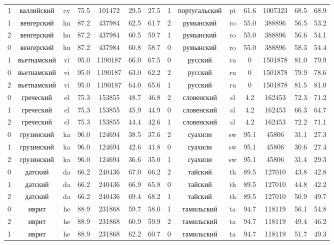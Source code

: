 \begin{table*}
{\begin{tabular}{|c|c|c|c|c|c|c|||c|c|c|c|c|c|c|}
1 & валлийский & cy & 75.5 & 101472 & 29.5 & 27.5 & 1 & португальский & pt & 61.6 & 1007323 & 68.5 & 68.9\\
1 & венгерский & hu & 87.2 & 437984 & 62.5 & 61.7 & 2 & румынский & ro & 55.0 & 388896 & 56.5 & 53.2\\
2 & венгерский & hu & 87.2 & 437984 & 60.5 & 59.7 & 1 & румынский & ro & 55.0 & 388896 & 56.6 & 54.1\\
0 & венгерский & hu & 87.2 & 437984 & 60.8 & 58.7 & 0 & румынский & ro & 55.0 & 388896 & 58.3 & 54.4\\
1 & вьетнамский & vi & 95.0 & 1190187 & 66.0 & 67.5 & 0 & русский & ru & 0 & 1501878 & 81.0 & 79.9\\
0 & вьетнамский & vi & 95.0 & 1190187 & 63.0 & 62.2 & 2 & русский & ru & 0 & 1501878 & 79.9 & 78.6\\
2 & вьетнамский & vi & 95.0 & 1190187 & 64.0 & 65.6 & 1 & русский & ru & 0 & 1501878 & 81.5 & 81.0\\
0 & греческий & el & 75.3 & 153855 & 48.7 & 46.8 & 2 & словенский & sl & 4.2 & 162453 & 72.3 & 71.2\\
1 & греческий & el & 75.3 & 153855 & 45.9 & 44.9 & 0 & словенский & sl & 4.2 & 162453 & 66.3 & 64.7\\
2 & греческий & el & 75.3 & 153855 & 44.4 & 42.6 & 1 & словенский & sl & 4.2 & 162453 & 72.2 & 71.1\\
0 & грузинский & ka & 96.0 & 124694 & 38.5 & 37.6 & 2 & суахили & sw & 95.1 & 45806 & 31.1 & 27.3\\
1 & грузинский & ka & 96.0 & 124694 & 42.6 & 41.8 & 0 & суахили & sw & 95.1 & 45806 & 30.6 & 27.4\\
2 & грузинский & ka & 96.0 & 124694 & 36.6 & 35.0 & 1 & суахили & sw & 95.1 & 45806 & 31.4 & 29.3\\
0 & датский & da & 66.2 & 240436 & 67.0 & 66.2 & 2 & тайский & th & 89.5 & 127010 & 43.8 & 42.8\\
1 & датский & da & 66.2 & 240436 & 66.9 & 65.8 & 0 & тайский & th & 89.5 & 127010 & 44.8 & 42.2\\
2 & датский & da & 66.2 & 240436 & 69.4 & 68.2 & 1 & тайский & th & 89.5 & 127010 & 50.9 & 49.7\\
0 & иврит & he & 88.9 & 231868 & 59.7 & 58.0 & 1 & тамильский & ta & 94.7 & 118119 & 56.1 & 54.8\\
2 & иврит & he & 88.9 & 231868 & 60.9 & 59.9 & 2 & тамильский & ta & 94.7 & 118119 & 49.4 & 46.2\\
1 & иврит & he & 88.9 & 231868 & 62.2 & 60.7 & 0 & тамильский & ta & 94.7 & 118119 & 51.7 & 49.3\\

\end{tabular}}
\end{table*}
